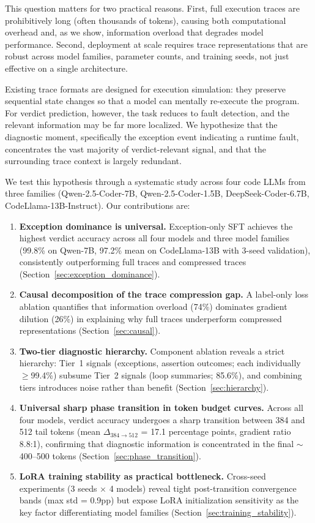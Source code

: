 \documentclass[11pt,a4paper]{article}
\begin{document}
This question matters for two practical reasons. First, full execution traces are prohibitively long (often thousands of tokens), causing both computational overhead and, as we show, information overload that degrades model performance. Second, deployment at scale requires trace representations that are robust across model families, parameter counts, and training seeds, not just effective on a single architecture.

Existing trace formats are designed for execution simulation: they preserve sequential state changes so that a model can mentally re-execute the program. For verdict prediction, however, the task reduces to fault detection, and the relevant information may be far more localized. We hypothesize that the diagnostic moment, specifically the exception event indicating a runtime fault, concentrates the vast majority of verdict-relevant signal, and that the surrounding trace context is largely redundant.

We test this hypothesis through a systematic study across four code LLMs from three families (Qwen-2.5-Coder-7B, Qwen-2.5-Coder-1.5B, DeepSeek-Coder-6.7B, CodeLlama-13B-Instruct). Our contributions are:

\begin{enumerate}
\item \textbf{Exception dominance is universal.} Exception-only SFT achieves the highest verdict accuracy across all four models and three model families (99.8\% on Qwen-7B, 97.2\% mean on CodeLlama-13B with 3-seed validation), consistently outperforming full traces and compressed traces (Section~\ref{sec:exception_dominance}).
\item \textbf{Causal decomposition of the trace compression gap.} A label-only loss ablation quantifies that information overload (74\%) dominates gradient dilution (26\%) in explaining why full traces underperform compressed representations (Section~\ref{sec:causal}).
\item \textbf{Two-tier diagnostic hierarchy.} Component ablation reveals a strict hierarchy: Tier~1 signals (exceptions, assertion outcomes; each individually $\geq$99.4\%) subsume Tier~2 signals (loop summaries; 85.6\%), and combining tiers introduces noise rather than benefit (Section~\ref{sec:hierarchy}).
\item \textbf{Universal sharp phase transition in token budget curves.} Across all four models, verdict accuracy undergoes a sharp transition between 384 and 512 tail tokens (mean $\Delta_{384 \to 512}$ = 17.1 percentage points, gradient ratio 8.8:1), confirming that diagnostic information is concentrated in the final $\sim$400--500 tokens (Section~\ref{sec:phase_transition}).
\item \textbf{LoRA training stability as practical bottleneck.} Cross-seed experiments (3 seeds $\times$ 4 models) reveal tight post-transition convergence bands (max std = 0.9pp) but expose LoRA initialization sensitivity as the key factor differentiating model families (Section~\ref{sec:training_stability}).
\end{enumerate}
\end{document}
